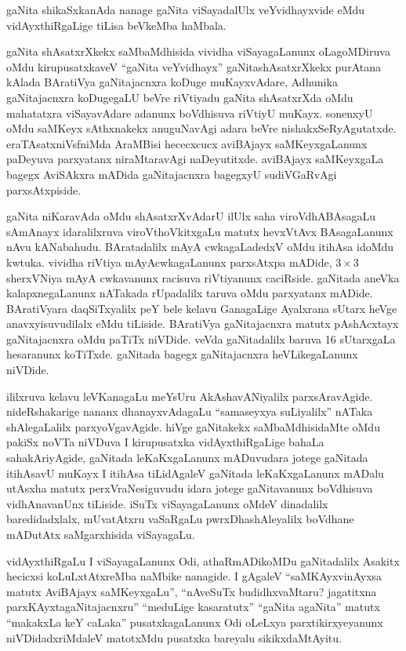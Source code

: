 gaNita shikaSxkanAda nanage gaNita viSayadalUlx veYvidhayxvide eMdu vidAyxthiRgaLige tiLisa beVkeMba haMbala.

gaNita shAsatxrXkekx saMbaMdhisida vividha viSayagaLanunx oLagoMDiruva oMdu kirupusatxkaveV ``gaNita veYvidhayx'' gaNitashAsatxrXkekx purAtana kAlada BAratiVya gaNitajacnxra koDuge muKayxvAdare, Adhunika gaNitajacnxra koDugegaLU beVre riVtiyadu gaNita shAsatxrXda oMdu mahatatxra viSayavAdare adanunx boVdhisuva riVtiyU muKayx. sonenxyU oMdu saMKeyx sAthxnakekx anuguNavAgi adara beVre nishakxSeRyAgutatxde. eraTAsatxniVsfniMda AraMBisi
hececxcucx aviBAjayx saMKeyxgaLanunx paDeyuva parxyatanx niraMtaravAgi naDeyutitxde. aviBAjayx saMKeyxgaLa bagegx AviSAkxra mADida gaNitajacnxra bagegxyU sudiVGaRvAgi parxsAtxpiside.

gaNita niKaravAda oMdu shAsatxrXvAdarU ilUlx saha viroVdhABAsagaLu sAmAnayx idaralilxruva viroVthoVkitxgaLu matutx hevxVtAvx BAsagaLanunx nAvu kANabahudu. BAratadalilx mAyA cwkagaLadedxV oMdu itihAsa idoMdu kwtuka. vividha riVtiya mAyAcwkagaLanunx parxsAtxpa mADide, $3\times 3$ sherxVNiya mAyA cwkavanunx racisuva riVtiyanunx caciRside. gaNitada aneVka kalapxnegaLanunx nATakada rUpadalilx taruva oMdu parxyatanx mADide. BAratiVyara daqSiTxyalilx peY bele kelavu GanagaLige Ayalxrana sUtarx heVge anavxyisuvudilalx eMdu tiLiside. BAratiVya gaNitajacnxra matutx pAshAcxtayx gaNitaja\-cnxra oMdu paTiTx niVDide. veVda gaNitadalilx baruva {\rm 16} sUtarxgaLa hesaranunx koTiTxde. gaNitada bagegx gaNitajacnxra heVLikegaLanunx niVDide.

ililxruva kelavu leVKanagaLu meYsUru AkAshavANiyalilx parxsAravAgide. nideRshakarige nananx dhanayxvAdagaLu ``samaseyxya suLiyalilx'' nATaka shAlegaLalilx parxyoVgavAgide. hiVge gaNitakekx saMbaMdhisidaMte oMdu pakiSx noVTa niVDuva I kirupusatxka vidAyxthiRgaLige bahaLa sahakAriyAgide, gaNitada leKaKxgaLanunx mADuvudara jotege gaNitada itihAsavU muKayx I itihAsa tiLidAgaleV gaNitada leKaKxgaLanunx mADalu utAsxha matutx perxVraNesiguvudu idara jotege gaNitavanunx boVdhisuva vidhAnavanUnx tiLiside. iSuTx viSayagaLanunx oMdeV dinadalilx baredidadxlalx, mUvatAtxru vaSaRgaLu pwrxDhashAleyalilx boVdhane mADutAtx saMgarxhisida viSayagaLu.

vidAyxthiRgaLu I viSayagaLanunx Odi, athaRmADikoMDu gaNitadalilx Asakitx hecicxsi koLuLxtAtxreMba naMbike nanagide. I gAgaleV ``saMKAyxvinAyxsa matutx AviBAjayx saMKeyxgaLu'',  ``nAveSuTx budidhxvaMtaru? jagatitxna parxKAyxtagaNitajacnxru'' ``meduLige kasaratutx'' ``gaNita agaNita'' matutx ``makakxLa keY caLaka'' pusatxkagaLanunx Odi oLeLxya parxtikirxyeyanunx niVDidadxriMdaleV matotxMdu pusatxka bareyalu sikikxdaMtAyitu.

